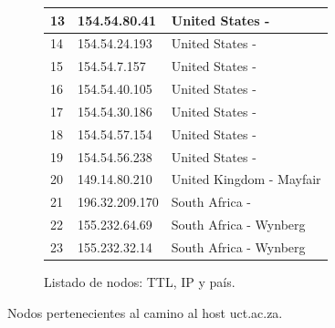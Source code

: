 \begin{figure}[ht]
\begin{subfigure}[b]{.39\textwidth}
\begin{tabular}{ l l l }
      13 & 154.54.80.41 & United States - \\ \hline
      14 & 154.54.24.193 & United States - \\ \hline
      15 & 154.54.7.157 & United States - \\ \hline
      16 & 154.54.40.105 & United States - \\ \hline
      \rowcolor[RGB]{196,214,255}
      17 & 154.54.30.186 & United States - \\ \hline
      18 & 154.54.57.154 & United States - \\ \hline
      19 & 154.54.56.238 & United States - \\ \hline
      20 & 149.14.80.210 & United Kingdom - Mayfair\\ \hline
      \rowcolor[RGB]{196,214,255}
      21 & 196.32.209.170 & South Africa - \\ \hline
      22 & 155.232.64.69 & South Africa - Wynberg\\ \hline
      23 & 155.232.32.14 & South Africa - Wynberg\\ \hline
      \hline
    \end{tabular}
    \label{fig:capetown_list}
    \caption{Listado de nodos: TTL, IP y país.}
  \end{subfigure}
  \caption{Nodos pertenecientes al camino al host uct.ac.za.}
\end{figure}
